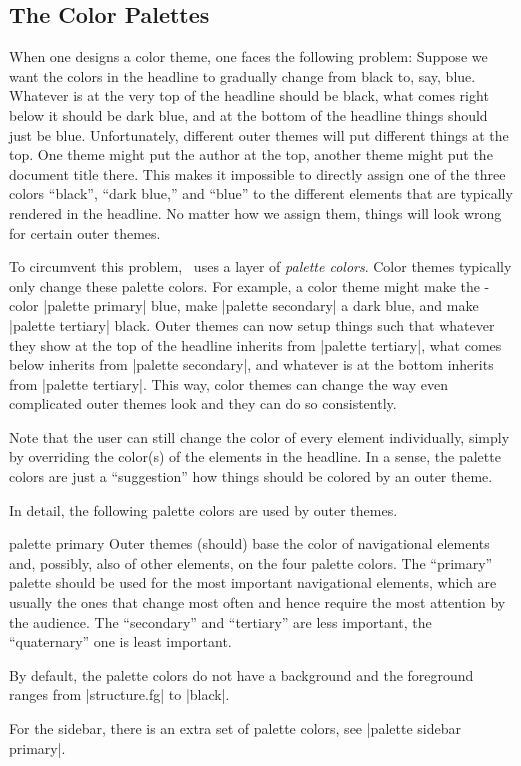 \subsection{The Color Palettes}

When one designs a color theme, one faces the following problem:
Suppose we want the colors in the headline to gradually change from
black to, say, blue. Whatever is at the very top of the headline
should be black, what comes right below it should be dark blue, and at
the bottom of the headline things should just be blue. Unfortunately,
different outer themes will put different things at the top. One theme
might put the author at the top, another theme might put the document
title there. This makes it impossible to directly assign one of the
three colors ``black'', ``dark blue,'' and ``blue'' to the different
elements that are typically rendered in the headline. No matter how we
assign them, things will look wrong for certain outer themes.

To circumvent this problem, \beamer\ uses a layer of \emph{palette
colors}. Color themes typically only change these palette colors. For
example, a color theme might make the \beamer-color |palette primary|
blue, make |palette secondary| a dark blue, and make |palette tertiary|
black. Outer themes can now setup things such that whatever they show
at the top of the headline inherits from |palette tertiary|, what comes
below inherits from |palette secondary|, and whatever is at the bottom
inherits from |palette tertiary|. This way, color themes can change the
way even complicated outer themes look and they can do so
consistently.

Note that the user can still change the color of every element
individually, simply by overriding the color(s) of the elements in the
headline. In a sense, the palette colors are just a ``suggestion'' how
things should be colored by an outer theme.

In detail, the following palette colors are used by outer themes.


\begin{element}{palette primary}\no\yes\no
  Outer themes (should) base the color of navigational elements and,
  possibly, also of other elements, on the four palette colors. The
  ``primary'' palette should be used for the most important
  navigational elements, which are usually the ones that change most
  often and hence require the most attention by the audience. The
  ``secondary'' and ``tertiary'' are less important, the ``quaternary'' one
  is least important.

  By default, the palette colors do not have a background and the
  foreground ranges from |structure.fg| to |black|.

  For the sidebar, there is an extra set of palette colors, see
  |palette sidebar primary|. 
\end{element}

